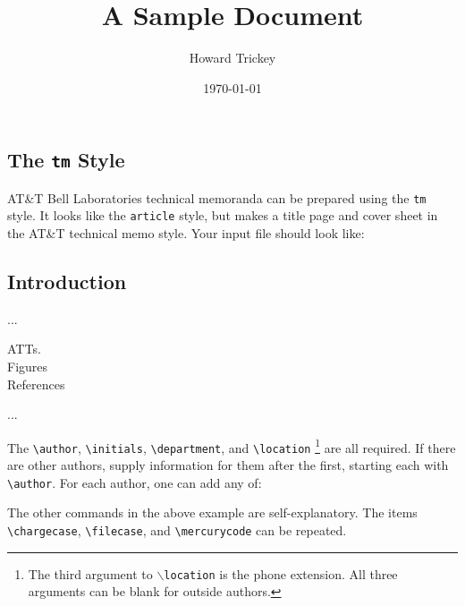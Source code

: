 \subsection{The {\tt tm} Style}
\label{tmstylesec}

AT\&T Bell Laboratories technical memoranda can be prepared using
the {\tt tm} style.
It looks like the {\tt article} style, but makes a title page
and cover sheet in the AT\&T technical memo style.
Your input file should look like:
\begin{eg}
\title{A Sample Document}
\author{Howard Trickey}
\date{\today}

\makehead
\makeabstract
\section{Introduction}
...
\makesignature

\noindent ATTs.\\
Figures\\
References

\medskip
{}

\begin{thebibliography}{99}
...
\end{thebibliography}
\coversheet

\end{eg}
The \verb|\author|, \verb|\initials|, \verb|\department|, and
\verb|\location|%
\footnote{The third argument to {\tt $\backslash$location} is the phone extension.
All three arguments can be blank for outside authors.}
are all required.  If there are other authors,
supply information for them after the first, starting each
with \verb|\author|.
For each author, one can add any of:
\begin{eg}
\end{eg}
The other commands in the above example are self-explanatory.
The items \verb|\chargecase|, \verb|\filecase|, and \verb|\mercurycode|
can be repeated.

